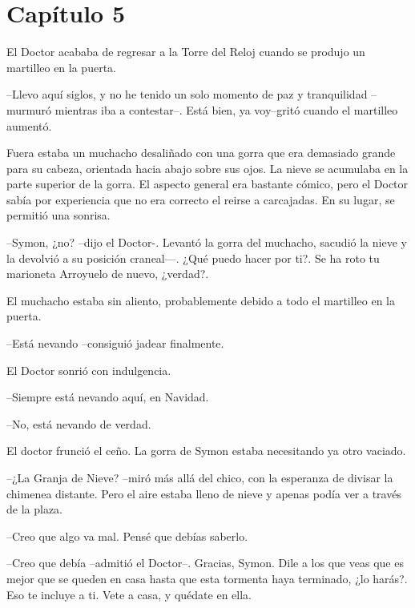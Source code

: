 \chapter*{Capítulo 5}

El Doctor acababa de regresar a la Torre del Reloj cuando se produjo un martilleo en la puerta.



--Llevo aquí siglos, y no he tenido un solo momento de paz y tranquilidad --murmuró mientras iba a contestar--. Está bien, ya voy--gritó cuando el martilleo aumentó.



Fuera estaba un muchacho desaliñado con una gorra que era demasiado grande para su cabeza, orientada hacia abajo sobre sus ojos. La nieve se acumulaba en la parte superior de la gorra. El aspecto general era bastante cómico, pero el Doctor sabía por experiencia que no era correcto el reirse a carcajadas. En su lugar, se permitió una sonrisa.



--Symon, ¿no? --dijo el Doctor-. Levantó la gorra del muchacho, sacudió la nieve y la devolvió a su posición craneal—. ¿Qué puedo hacer por ti?. Se ha roto tu marioneta Arroyuelo de nuevo, ¿verdad?.



El muchacho estaba sin aliento, probablemente debido a todo el martilleo en la puerta.


--Está nevando --consiguió jadear finalmente.



El Doctor sonrió con indulgencia.


--Siempre está nevando aquí, en Navidad.



--No, está nevando de verdad.



El doctor frunció el ceño. La gorra de Symon estaba necesitando ya otro vaciado. 


--¿La Granja de Nieve? --miró más allá del chico, con la esperanza de divisar la chimenea distante. Pero el aire estaba lleno de nieve y apenas podía ver a través de la plaza.



--Creo que algo va mal. Pensé que debías saberlo.



--Creo que debía --admitió el Doctor--. Gracias, Symon. Dile a los que veas que es mejor que se queden en casa hasta que esta tormenta haya terminado, ¿lo harás?. Eso te incluye a ti. Vete a casa, y quédate en ella.



